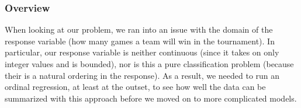 \documentclass[10pt,a4paper, hidelinks]{article} %
\begin{document}
\subsubsection{Overview}
When looking at our problem, we ran into an issue with the domain of the response variable (how many games a team will win in the tournament). In particular, our response variable is neither continuous (since it takes on only integer values and is bounded), nor is this a pure classification problem (because their is a natural ordering in the response). As a result, we needed to run an ordinal regression, at least at the outset, to see how well the data can be summarized with this approach before we moved on to more complicated models.  

%
%
%
%	
%
\end{document}
